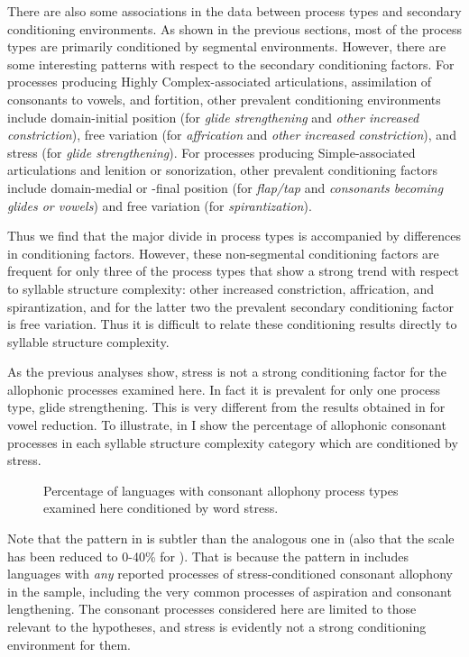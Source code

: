   There are also some associations in the data between process types and secondary conditioning environments. As shown in the previous sections, most of the process types are primarily conditioned by segmental environments. However, there are some interesting patterns with respect to the secondary conditioning factors. For processes producing Highly Complex-associated articulations, assimilation of consonants to vowels, and fortition, other prevalent conditioning environments include domain-initial position (for \textit{glide strengthening} and \textit{other increased constriction}), free variation (for \textit{affrication} and \textit{other increased constriction}), and stress (for \textit{glide strengthening}). For processes producing Simple-associated articulations and lenition or sonorization, other prevalent conditioning factors include domain-medial or -final position (for \textit{flap/tap} and \textit{consonants becoming glides or vowels}) and free variation (for \textit{spirantization}). 

  Thus we find that the major divide in process types is accompanied by differences in conditioning factors. However, these non-segmental conditioning factors are frequent for only three of the process types that show a strong trend with respect to syllable structure complexity: other increased constriction, affrication, and spirantization, and for the latter two the prevalent secondary conditioning factor is free variation. Thus it is difficult to relate these conditioning results directly to syllable structure complexity.

  As the previous analyses show, stress is not a strong conditioning factor for the allophonic processes examined here. In fact it is prevalent for only one process type, glide strengthening. This is very different from the results obtained in  for vowel reduction. To illustrate, in  I show the percentage of allophonic consonant processes in each syllable structure complexity category which are conditioned by stress.

  
\begin{figure}
\caption{\label{fig:7.11} Percentage of languages with consonant allophony process types examined here conditioned by word stress.}
\end{figure}

  Note that the pattern in  is subtler than the analogous one in  (also that the scale has been reduced to 0-40\% for ). That is because the pattern in  includes languages with \textit{any} reported processes of stress-conditioned consonant allophony in the sample, including the very common processes of aspiration and consonant lengthening. The consonant processes considered here are limited to those relevant to the hypotheses, and stress is evidently not a strong conditioning environment for them.


